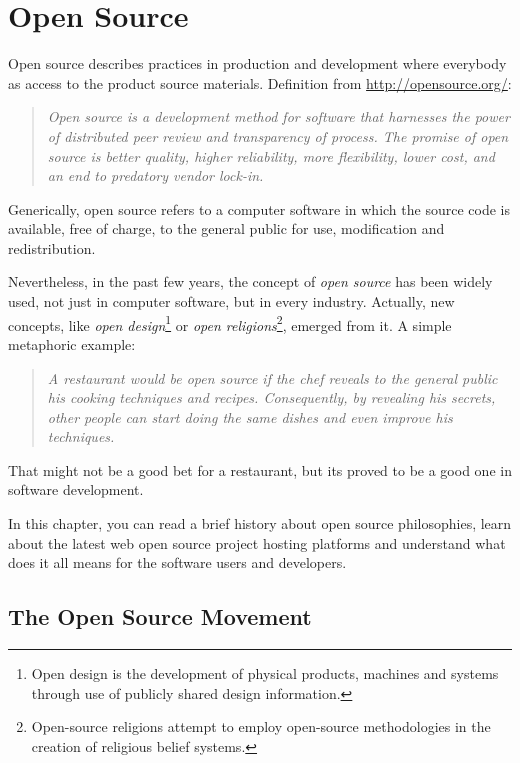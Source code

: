 \thispagestyle{empty}
\chapter{Open Source}\label{chap:open_source}



Open source describes practices in production and development where everybody as access to the product source materials.
Definition from \url{http://opensource.org/}:
\begin{quote}\emph{
  Open source is a development method for software that harnesses the power of distributed peer review and transparency of process.
  The promise of open source is better quality, higher reliability, more flexibility, lower cost, 
  and an end to predatory vendor lock-in.
}\end{quote}

Generically, open source refers to a computer software in which the source code is available, free of charge, to the general public for use, modification and redistribution.

Nevertheless, in the past few years, the concept of \emph{open source} 
has been widely used, not just in computer software, but in every industry.
Actually, new concepts, like 
\emph{open design}\footnote{
  Open design is the development of physical products, machines and systems through use of publicly shared design information.
} or 
\emph{open religions}\footnote{
  Open-source religions attempt to employ open-source methodologies in the creation of religious belief systems.
},
emerged from it.
A simple metaphoric example: 
\begin{quote}\emph{
A restaurant would be open source if the chef reveals to the general public his cooking techniques and recipes.
Consequently, by revealing his secrets, other people can start doing the same dishes and even improve his techniques.
}\end{quote}
That might not be a good bet for a restaurant, but its proved to be a good one in software development.

In this chapter, you can read a brief history about open source philosophies, 
learn about the latest web open source project hosting platforms
and understand what does it all means for the software users and developers.


\section{The Open Source Movement}

